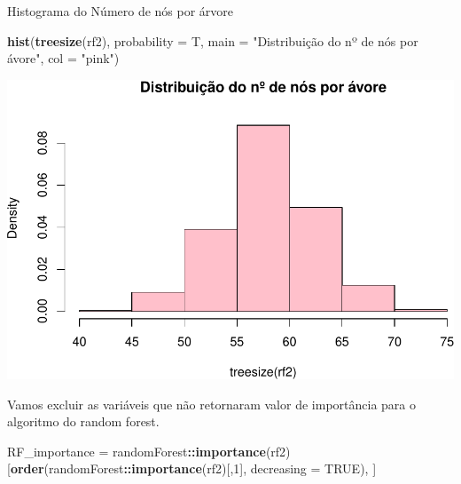 \documentclass[]{article}
\newenvironment{Shaded}{\begin{snugshade}}{\end{snugshade}}
\newcommand{\CommentTok}[1]{\textcolor[rgb]{0.56,0.35,0.01}{\textit{#1}}}
\newcommand{\DataTypeTok}[1]{\textcolor[rgb]{0.13,0.29,0.53}{#1}}
\newcommand{\DecValTok}[1]{\textcolor[rgb]{0.00,0.00,0.81}{#1}}
\newcommand{\KeywordTok}[1]{\textcolor[rgb]{0.13,0.29,0.53}{\textbf{#1}}}
\newcommand{\NormalTok}[1]{#1}
\newcommand{\OperatorTok}[1]{\textcolor[rgb]{0.81,0.36,0.00}{\textbf{#1}}}
\newcommand{\OtherTok}[1]{\textcolor[rgb]{0.56,0.35,0.01}{#1}}
\newcommand{\StringTok}[1]{\textcolor[rgb]{0.31,0.60,0.02}{#1}}
\begin{document}
Histograma do Número de nós por árvore

\begin{Shaded}
\begin{Highlighting}[]
\KeywordTok{hist}\NormalTok{(}\KeywordTok{treesize}\NormalTok{(rf2), }\DataTypeTok{probability =}\NormalTok{ T,}
     \DataTypeTok{main =} \StringTok{"Distribuição do nº de nós por ávore"}\NormalTok{,}
     \DataTypeTok{col =} \StringTok{"pink"}\NormalTok{)}
\end{Highlighting}
\end{Shaded}

\includegraphics{markdown_v50_files/figure-latex/unnamed-chunk-99-1.pdf}

Vamos excluir as variáveis que não retornaram valor de importância para
o algoritmo do random forest.

\begin{Shaded}
\begin{Highlighting}[]
\NormalTok{RF_importance =}\StringTok{ }\NormalTok{randomForest}\OperatorTok{::}\KeywordTok{importance}\NormalTok{(rf2)[}\KeywordTok{order}\NormalTok{(randomForest}\OperatorTok{::}\KeywordTok{importance}\NormalTok{(rf2)[,}\DecValTok{1}\NormalTok{], }\DataTypeTok{decreasing =} \OtherTok{TRUE}\NormalTok{), ]}
\end{Highlighting}
\end{Shaded}

\begin{Shaded}
\end{Shaded}
\end{document}
